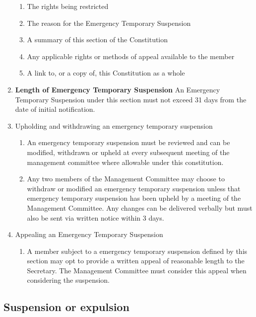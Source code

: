 \documentclass[../constitution.tex]{subfiles}
\begin{document}
\begin{enumerate}
\begin{enumerate}
  \item The rights being restricted\\
  \item The reason for the Emergency Temporary Suspension\\
  \item A summary of this section of the Constitution\\
  \item Any applicable rights or methods of appeal available to the member
  \item A link to, or a copy of, this Constitution as a whole\\
  \end{enumerate}
\item \textbf{Length of Emergency Temporary Suspension} An Emergency Temporary Suspension under this section must not exceed 31 days from the date of initial notification.\\
\item Upholding and withdrawing an emergency temporary suspension

  \begin{enumerate}
  
  \item An emergency temporary suspension must be reviewed and can be modified, withdrawn or upheld at every subsequent meeting of the management committee where allowable under this constitution.
  \item Any two members of the Management Committee may choose to withdraw or modified an emergency temporary suspension unless that emergency temporary suspension has been upheld by a meeting of the Management Committee. Any changes can be delivered verbally but must also be sent via written notice within 3 days.\\
  \end{enumerate}
\item Appealing an Emergency Temporary Suspension

  \begin{enumerate}
  
  \item A member subject to a emergency temporary suspension defined by this section may opt to provide a written appeal of reasonable length to the Secretary. The Management Committee must consider this appeal when considering the suspension.
  \end{enumerate}
\end{enumerate}

\hypertarget{suspension-or-expulsion}{%
\subsection{Suspension or expulsion}\label{suspension-or-expulsion}}
\end{document}
